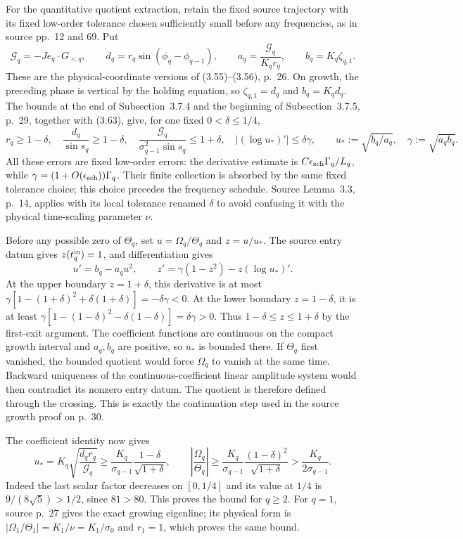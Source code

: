 For the quantitative quotient extraction, retain the fixed source
trajectory with its fixed low-order tolerance chosen sufficiently small
before any frequencies, as in source pp.~12 and 69. Put
\[
 \mathcal G_q=-Je_q\cdot G_{<q},\qquad
 d_q=r_q\sin(\phi_q-\phi_{q-1}),\qquad
 a_q=\frac{\mathcal G_q}{K_qr_q},\qquad
 b_q=K_q\zeta_{q,1}.
\]
These are the physical-coordinate versions of (3.55)--(3.56),
p.~26. On growth, the preceding phase is vertical by the
holding equation, so $\zeta_{q,1}=d_q$ and $b_q=K_qd_q$.
The bounds at the end of Subsection~3.7.4 and the beginning of
Subsection~3.7.5, p.~29, together with (3.63), give, for one
fixed $0<\delta\leq1/4$,
\[
 r_q\geq1-\delta,\quad
 \frac{d_q}{\sin s_q}\geq1-\delta,\quad
 \frac{\mathcal G_q}{\sigma_{q-1}^2\sin s_q}\leq1+\delta,
 \quad
 |(\log u_*)'|\leq\delta\gamma,
 \qquad u_*:=\sqrt{b_q/a_q},\quad\gamma:=\sqrt{a_qb_q}.
\]
All these errors are fixed low-order errors: the derivative
estimate is $C\epsilon_{\rm sch}\Gamma_q/L_q$, while
$\gamma=(1+O(\epsilon_{\rm sch}))\Gamma_q$.
Their finite collection is absorbed by the same fixed tolerance
choice; this choice precedes the frequency schedule. Source
Lemma~3.3, p.~14, applies with its local tolerance renamed
$\delta$ to avoid confusing it with the physical time-scaling
parameter $\nu$.

Before any possible zero of $\Theta_q$, set
$u=\Omega_q/\Theta_q$ and $z=u/u_*$. The source entry datum
gives $z(t_q^{\rm in})=1$, and differentiation gives
\[
 u'=b_q-a_qu^2,\qquad
 z'=\gamma(1-z^2)-z(\log u_*)'.
\]
At the upper boundary $z=1+\delta$, this derivative is at most
$\gamma[1-(1+\delta)^2+\delta(1+\delta)]
=-\delta\gamma<0$.
At the lower boundary $z=1-\delta$, it is at least
$\gamma[1-(1-\delta)^2-\delta(1-\delta)]
=\delta\gamma>0$.
Thus $1-\delta\leq z\leq1+\delta$ by the first-exit argument.
The coefficient functions are continuous on the compact growth
interval and $a_q,b_q$ are positive, so $u_*$ is bounded there.
If $\Theta_q$ first vanished, the bounded quotient would force
$\Omega_q$ to vanish at the same time. Backward uniqueness of
the continuous-coefficient linear amplitude system would then
contradict its nonzero entry datum. The quotient is therefore
defined through the crossing. This is exactly the continuation
step used in the source growth proof on p.~30.

The coefficient identity now gives
\[
 u_*=K_q\sqrt{\frac{d_qr_q}{\mathcal G_q}}
 \geq\frac{K_q}{\sigma_{q-1}}
 \frac{1-\delta}{\sqrt{1+\delta}},\qquad
 \left|\frac{\Omega_q}{\Theta_q}\right|
 \geq\frac{K_q}{\sigma_{q-1}}
 \frac{(1-\delta)^2}{\sqrt{1+\delta}}
 >\frac{K_q}{2\sigma_{q-1}}.
\]
Indeed the last scalar factor decreases on $[0,1/4]$ and its
value at $1/4$ is $9/(8\sqrt5)>1/2$, since $81>80$.
This proves the bound for $q\geq2$. For $q=1$, source p.~27
gives the exact growing eigenline; its physical form is
$|\Omega_1/\Theta_1|=K_1/\nu=K_1/\sigma_0$ and $r_1=1$,
which proves the same bound.
